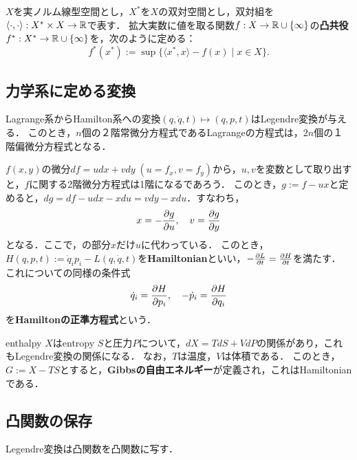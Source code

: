 \documentclass[uplatex, dvipdfmx]{jsreport}
\begin{document}
\begin{definition}
    $X$を実ノルム線型空間とし，$X^*$を$X$の双対空間とし，双対組を$\langle\cdot,\cdot\rangle:X^*\times X\to\mathbb{R}$で表す．
    拡大実数に値を取る関数$f:X\to\mathbb{R}\cup\{\infty\}$の\textbf{凸共役}$f^*:X^*\to\mathbb{R}\cup\{\infty\}$を，次のように定める：
    \[ f^*(x^*):=\sup\{\langle x^*,x\rangle-f(x)\mid x\in X\}. \]
\end{definition}

\subsection{力学系に定める変換}

\begin{tcolorbox}[colframe=ForestGreen, colback=ForestGreen!10!white,breakable,colbacktitle=ForestGreen!40!white,coltitle=black,fonttitle=\bfseries\sffamily,
title=]
    Lagrange系からHamilton系への変換$(q,\dot{q},t)\mapsto(q,p,t)$はLegendre変換が与える．
    このとき，$n$個の２階常微分方程式であるLagrangeの方程式は，$2n$個の１階偏微分方程式となる．
\end{tcolorbox}

\begin{discussion}
    $f(x,y)$の微分$df=udx+vdy\;(u=f_x,v=f_y)$から，$u,v$を変数として取り出すと，$f$に関する2階微分方程式は1階になるであろう．
    このとき，$g:=f-ux$と定めると，$dg=df-udx-xdu=vdy-xdu$．すなわち，
    \[x=-\frac{\partial g}{\partial u},\quad v=\frac{\partial g}{\partial y}\]
    となる．ここで，の部分$x$だけ$u$に代わっている．
    このとき，$H(q,p,t):=\dot{q}_ip_i-L(q,\dot{q},t)$を\textbf{Hamiltonian}といい，$-\frac{\partial L}{\partial t}=\frac{\partial H}{\partial t}$を満たす．
    これについての同様の条件式
    \[\dot{q}_i=\frac{\partial H}{\partial p_i},\quad-\dot{p}_i=\frac{\partial H}{\partial q_i}\]
    を\textbf{Hamiltonの正準方程式}という．
\end{discussion}
\begin{example}
    enthalpy $X$はentropy $S$と圧力$P$について，$dX=TdS+VdP$の関係があり，これもLegendre変換の関係になる．
    なお，$T$は温度，$V$は体積である．
    このとき，$G:=X-TS$とすると，\textbf{Gibbsの自由エネルギー}が定義され，これはHamiltonianである．
\end{example}

\subsection{凸関数の保存}

\begin{proposition}
    Legendre変換は凸関数を凸関数に写す．
\end{proposition}
\end{document}
